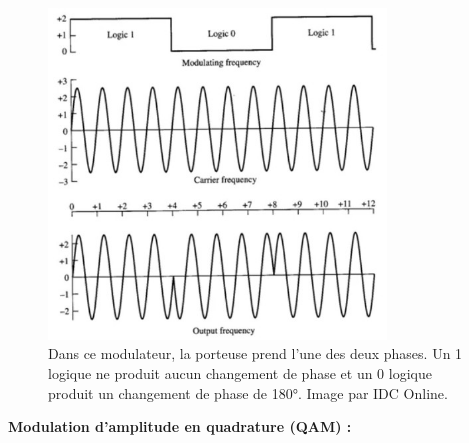 \begin{figure}[H] %
    \centering
    \includegraphics[width=0.8\textwidth]{figures/6-43.jpg}
    \caption{Dans ce modulateur, la porteuse prend l'une des deux phases. Un 1 logique ne produit aucun changement de phase et un 0 logique produit un changement de phase de 180°. Image par IDC Online.}
    \label{fig:communication2}
\end{figure}
\textbf{Modulation d'amplitude en quadrature (QAM) :}
